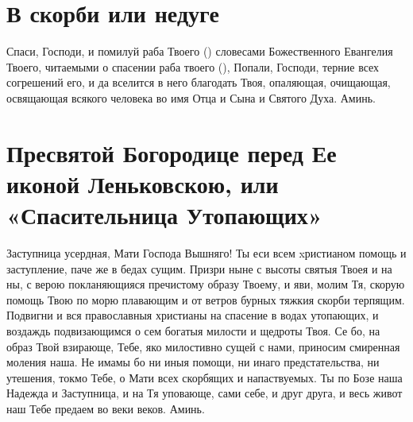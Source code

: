 \vspace{-1.5\baselineskip}\section{В скорби или недуге}\begin{mymulticols}
 

Спаси, Господи, и помилуй раба Твоего () словесами Божественного Евангелия Твоего, читаемыми о спасении раба твоего (), Попали, Господи, терние всех согрешений его, и да вселится в него благодать Твоя, опаляющая, очищающая, освящающая всякого человека во имя Отца и Сына и Святого Духа. Аминь.


\end{mymulticols}

\mychapterending{}


\section{Пресвятой Богородице перед Ее иконой Леньковскою, или «Спасительница Утопающих»}\begin{mymulticols}
 


Заступница усердная, Мати Господа Вышняго! Ты еси всем xристианом помощь и заступление, паче же в бедах сущим. Призри ныне с высоты святыя Твоея и на ны, с верою покланяющияся пречистому образу Твоему, и яви, молим Тя, скорую помощь Твою по морю плавающим и от ветров бурных тяжкия скорби терпящим. Подвигни и вся православныя христианы на спасение в водах утопающих, и воздаждь подвизающимся о сем богатыя милости и щедроты Твоя. Се бо, на образ Твой взирающе, Тебе, яко милостивно сущей с нами, приносим смиренная моления наша. Не имамы бо ни иныя помощи, ни инаго предстательства, ни утешения, токмо Тебе, о Мати всех скорбящих и напаствуемых. Ты по Бозе наша Надежда и Заступница, и на Тя уповающе, сами себе, и друг друга, и весь живот наш Тебе предаем во веки веков. Аминь.

\end{mymulticols}

